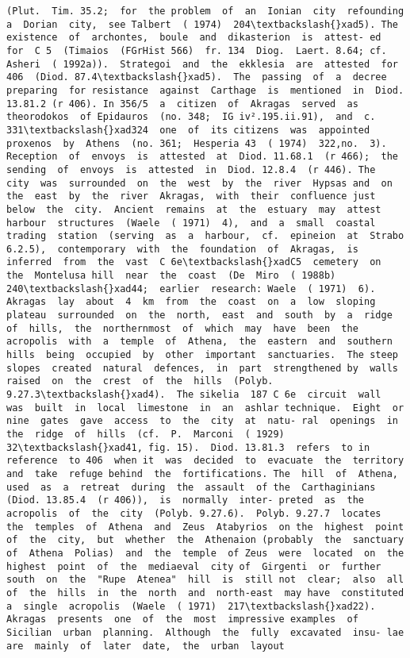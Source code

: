 \documentclass[11pt]{article}
\begin{document}
\begin{Verbatim}[commandchars=\\\{\}]
(Plut.  Tim. 35.2;  for  the problem  of  an  Ionian  city  refounding  a  Dorian  city,  see Talbert  ( 1974)  204\textbackslash{}xad5). The  existence  of  archontes,  boule  and  dikasterion  is  attest- ed  for  C 5  (Timaios  (FGrHist 566)  fr. 134  Diog.  Laert. 8.64; cf.  Asheri  ( 1992a)).  Strategoi  and  the  ekklesia  are  attested  for 406  (Diod. 87.4\textbackslash{}xad5).  The  passing  of  a  decree  preparing  for resistance  against  Carthage  is  mentioned  in  Diod. 13.81.2 (r 406). In 356/5  a  citizen  of  Akragas  served  as  theorodokos  of Epidauros  (no. 348;  IG iv².195.ii.91),  and  c. 331\textbackslash{}xad324  one  of  its citizens  was  appointed  proxenos  by  Athens  (no. 361;  Hesperia 43  ( 1974)  322,no.  3).  Reception  of  envoys  is  attested  at  Diod. 11.68.1  (r 466);  the  sending  of  envoys  is  attested  in  Diod. 12.8.4  (r 446). The  city  was  surrounded  on  the  west  by  the  river  Hypsas and  on  the  east  by  the  river  Akragas,  with  their  confluence just  below  the  city.  Ancient  remains  at  the  estuary  may  attest harbour  structures  (Waele  ( 1971)  4),  and  a  small  coastal trading  station  (serving  as  a  harbour,  cf.  epineion  at  Strabo 6.2.5),  contemporary  with  the  foundation  of  Akragas,  is inferred  from  the  vast  C 6e\textbackslash{}xadC5  cemetery  on  the  Montelusa hill  near  the  coast  (De  Miro  ( 1988b)  240\textbackslash{}xad44;  earlier  research: Waele  ( 1971)  6). Akragas  lay  about  4  km  from  the  coast  on  a  low  sloping plateau  surrounded  on  the  north,  east  and  south  by  a  ridge of  hills,  the  northernmost  of  which  may  have  been  the acropolis  with  a  temple  of  Athena,  the  eastern  and  southern hills  being  occupied  by  other  important  sanctuaries.  The steep  slopes  created  natural  defences,  in  part  strengthened by  walls  raised  on  the  crest  of  the  hills  (Polyb. 9.27.3\textbackslash{}xad4).  The sikelia  187 C 6e  circuit  wall  was  built  in  local  limestone  in  an  ashlar technique.  Eight  or  nine  gates  gave  access  to  the  city  at  natu- ral  openings  in  the  ridge  of  hills  (cf.  P.  Marconi  ( 1929)  32\textbackslash{}xad41, fig. 15).  Diod. 13.81.3  refers  to in  reference  to 406  when it  was  decided  to  evacuate  the  territory  and  take  refuge behind  the  fortifications. The  hill  of  Athena,  used  as  a  retreat  during  the  assault  of the  Carthaginians  (Diod. 13.85.4  (r 406)),  is  normally  inter- preted  as  the  acropolis  of  the  city  (Polyb. 9.27.6).  Polyb. 9.27.7  locates  the  temples  of  Athena  and  Zeus  Atabyrios  on the  highest  point  of  the  city,  but  whether  the  Athenaion (probably  the  sanctuary  of  Athena  Polias)  and  the  temple  of Zeus  were  located  on  the  highest  point  of  the  mediaeval  city of  Girgenti  or  further  south  on  the  "Rupe  Atenea"  hill  is  still not  clear;  also  all  of  the  hills  in  the  north  and  north-east  may have  constituted  a  single  acropolis  (Waele  ( 1971)  217\textbackslash{}xad22). Akragas  presents  one  of  the  most  impressive examples  of Sicilian  urban  planning.  Although  the  fully  excavated  insu- lae  are  mainly  of  later  date,  the  urban  layout 
\end{Verbatim}
\end{document}

